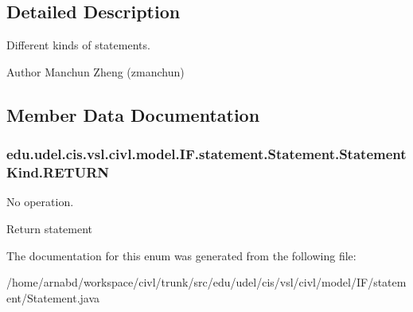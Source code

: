 \subsection{Detailed Description}
Different kinds of statements. 

\begin{DoxyAuthor}{Author}
Manchun Zheng (zmanchun) 
\end{DoxyAuthor}


\subsection{Member Data Documentation}
\hypertarget{enumedu_1_1udel_1_1cis_1_1vsl_1_1civl_1_1model_1_1IF_1_1statement_1_1Statement_1_1StatementKind_a37f005914ca901435e5bd336e28ba8b2}{}
\subsubsection[{R\+E\+T\+U\+R\+N}]{\setlength{\rightskip}{0pt plus 5cm}edu.\+udel.\+cis.\+vsl.\+civl.\+model.\+I\+F.\+statement.\+Statement.\+Statement\+Kind.\+R\+E\+T\+U\+R\+N}\label{enumedu_1_1udel_1_1cis_1_1vsl_1_1civl_1_1model_1_1IF_1_1statement_1_1Statement_1_1StatementKind_a37f005914ca901435e5bd336e28ba8b2}


No operation. 

Return statement 

The documentation for this enum was generated from the following file\+:\begin{DoxyCompactItemize}
\item 
/home/arnabd/workspace/civl/trunk/src/edu/udel/cis/vsl/civl/model/\+I\+F/statement/Statement.\+java\end{DoxyCompactItemize}
